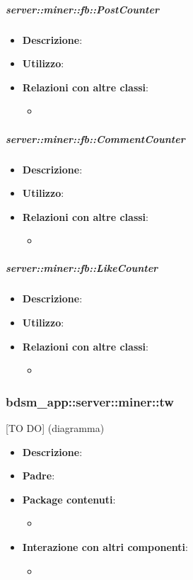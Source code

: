 	\subparagraph{server::miner::fb::PostCounter} %
		\label{subp:server_miner_fb_PostCounter}
			\begin{itemize}
				\item \textbf{Descrizione}:
				\item \textbf{Utilizzo}: 
				\item \textbf{Relazioni con altre classi}:
					\begin{itemize}
						\item 
					\end{itemize}
			\end{itemize}
	
	\subparagraph{server::miner::fb::CommentCounter} %
		\label{subp:server_miner_fb_CommentCounter}
			\begin{itemize}
				\item \textbf{Descrizione}:
				\item \textbf{Utilizzo}: 
				\item \textbf{Relazioni con altre classi}:
					\begin{itemize}
						\item 
					\end{itemize}
			\end{itemize}
	
	\subparagraph{server::miner::fb::LikeCounter} %
		\label{subp:server_miner_fb_LikeCounter}
			\begin{itemize}
				\item \textbf{Descrizione}:
				\item \textbf{Utilizzo}: 
				\item \textbf{Relazioni con altre classi}:
					\begin{itemize}
						\item 
					\end{itemize}
			\end{itemize}

\subsubsection{bdsm\_app::server::miner::tw} %
\label{ssub:bdsm_app_server_miner_tw}
[TO DO] (diagramma) \newline \newline

\begin{itemize}
  \item \textbf{Descrizione}:
  \item \textbf{Padre}:
  \item \textbf{Package contenuti}:
  	\begin{itemize}
  		\item
  	\end{itemize}
  \item \textbf{Interazione con altri componenti}:
  	\begin{itemize}
  		\item  	
  	\end{itemize}
\end{itemize}	

